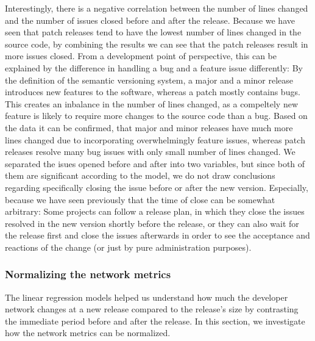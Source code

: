 Interestingly, there is a negative correlation between the number of lines changed and the number of issues closed before and after the release. Because we have seen that patch releases tend to have the lowest number of lines changed in the source code, by combining the results we can see that the patch releases result in more issues closed. From a development point of perspective, this can be explained by the difference in handling a bug and a feature issue differently: By the definition of the semantic versioning system, a major and a minor release introduces new features to the software, whereas a patch mostly contains bugs. This creates an inbalance in the number of lines changed, as a compeltely new feature is likely to require more changes to the source code than a bug. Based on the data it can be confirmed, that major and minor releases have much more lines changed due to incorporating overwhelmingly feature issues, whereas patch releases resolve many bug issues with only small number of lines changed. We separated the isues opened before and after into two variables, but since both of them are significant according to the model, we do not draw conclusions regarding specifically closing the issue before or after the new version. Especially, because we have seen previously that the time of close can be somewhat arbitrary: Some projects can follow a release plan, in which they close the issues resolved in the new version shortly before the release, or they can also wait for the release first and close the issues afterwards in order to see the acceptance and reactions of the change (or just by pure administration purposes). 

\subsubsection{Normalizing the network metrics}

The linear regression models helped us understand how much the developer network changes at a new release compared to the release's size by contrasting the immediate period before and after the release. In this section, we investigate how the network metrics can be normalized.\\

